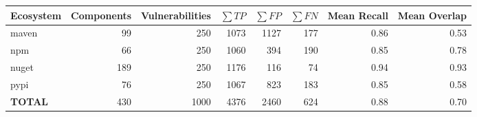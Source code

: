 \begin{table}[!t]
\centering
\small
\begin{tabular}{lrrrrrrr}
\toprule
Ecosystem & Components & Vulnerabilities & $\sum TP$ & $\sum FP$ & $\sum FN$ & Mean Recall & Mean Overlap \\
\midrule
maven & 99 & 250 & 1073 & 1127 & 177 & 0.86 & 0.53 \\
npm & 66 & 250 & 1060 & 394 & 190 & 0.85 & 0.78 \\
nuget & 189 & 250 & 1176 & 116 & 74 & 0.94 & 0.93 \\
pypi & 76 & 250 & 1067 & 823 & 183 & 0.85 & 0.58 \\
\midrule
\textbf{TOTAL} & 430 & 1000 & 4376 & 2460 & 624 & 0.88 & 0.70 \\
\bottomrule
\end{tabular}
\end{table}
